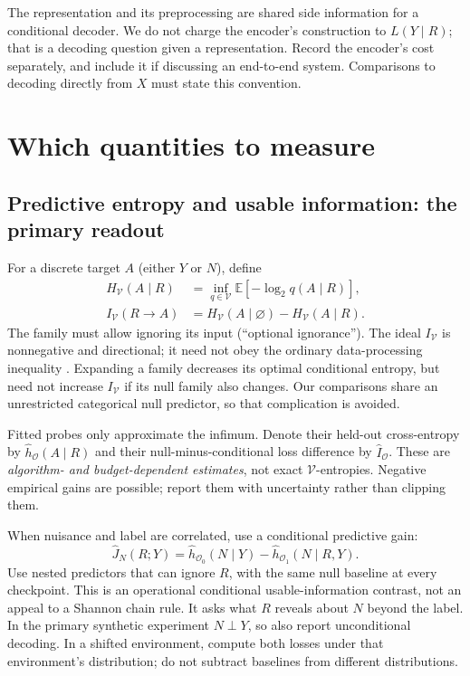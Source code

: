 \documentclass[11pt,a4paper]{article}
\newcommand{\E}{\mathbb E}
\newcommand{\V}{\mathcal V}
\begin{document}
The representation and its preprocessing are shared side information for a conditional decoder. We do not charge the encoder's construction to $L(Y\mid R)$; that is a decoding question given a representation. Record the encoder's cost separately, and include it if discussing an end-to-end system. Comparisons to decoding directly from $X$ must state this convention.

\section{Which quantities to measure}

\subsection{Predictive entropy and usable information: the primary readout}
For a discrete target $A$ (either $Y$ or $N$), define
\begin{align}
H_{\V}(A\mid R)&=\inf_{q\in\V}\E[-\log_2 q(A\mid R)],\\
I_{\V}(R\to A)&=H_{\V}(A\mid\varnothing)-H_{\V}(A\mid R).
\label{eq:vinfo}
\end{align}
The family must allow ignoring its input (``optional ignorance''). The ideal $I_{\V}$ is nonnegative and directional; it need not obey the ordinary data-processing inequality \citep{xu2020}. Expanding a family decreases its optimal conditional entropy, but need not increase $I_{\V}$ if its null family also changes. Our comparisons share an unrestricted categorical null predictor, so that complication is avoided.

Fitted probes only approximate the infimum. Denote their held-out cross-entropy by $\widehat h_{\mathcal O}(A\mid R)$ and their null-minus-conditional loss difference by $\widehat I_{\mathcal O}$. These are \emph{algorithm- and budget-dependent estimates}, not exact $\V$-entropies. Negative empirical gains are possible; report them with uncertainty rather than clipping them.

When nuisance and label are correlated, use a conditional predictive gain:
\begin{equation}
\widehat J_N(R;Y)=\widehat h_{\mathcal O_0}(N\mid Y)
                    -\widehat h_{\mathcal O_1}(N\mid R,Y).
\label{eq:conditional}
\end{equation}
Use nested predictors that can ignore $R$, with the same null baseline at every checkpoint. This is an operational conditional usable-information contrast, not an appeal to a Shannon chain rule. It asks what $R$ reveals about $N$ beyond the label. In the primary synthetic experiment $N\perp Y$, so also report unconditional decoding. In a shifted environment, compute both losses under that environment's distribution; do not subtract baselines from different distributions.
\end{document}
